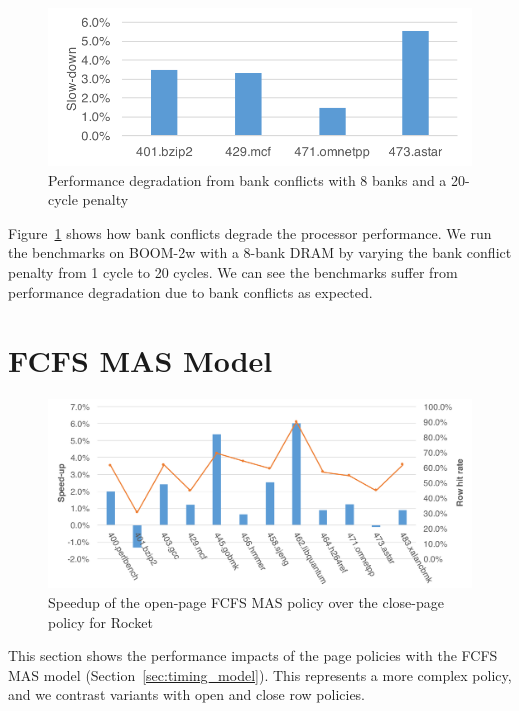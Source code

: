 \begin{figure}[t]
	\centering
	\includegraphics[width=0.8\columnwidth]{figures/boom-bc.pdf}
	\caption{Performance degradation from bank conflicts with 8 banks and a 20-cycle penalty}
	\label{fig:bank_conflict}
\end{figure}

Figure~\ref{fig:bank_conflict} shows how bank conflicts degrade the processor performance.
We run the benchmarks on BOOM-2w with a 8-bank DRAM by varying the bank conflict penalty 
from 1 cycle to 20 cycles. We can see the benchmarks suffer from performance degradation
due to bank conflicts as expected.

\section{FCFS MAS Model}

\begin{figure}[t]
		\centering
		\includegraphics[width=\columnwidth]{figures/rocket-fifomas.pdf}
		\caption{Speedup of the open-page FCFS MAS policy over the close-page policy for Rocket}
		\label{fig:rocket_fifo_mas}
\end{figure}

This section shows the performance impacts of the page policies with the FCFS MAS model
(Section~\ref{sec:timing_model}). This represents a more complex policy, and we contrast variants with open and close row policies.

